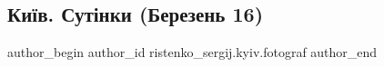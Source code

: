  
 
 
 
 

\subsection{Київ. Сутінки (Березень 16)}
\label{sec:16_03_2023.fb.ristenko_sergij.kyiv.fotograf.1.kyiv_sutinky_berezen_16}

\ifcmt
 author_begin
   author_id ristenko_sergij.kyiv.fotograf
 author_end
\fi
